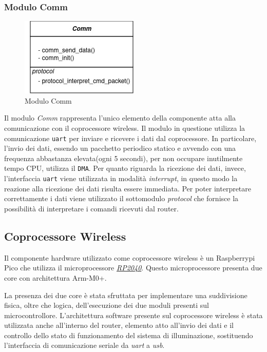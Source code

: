 \documentclass{article}
\begin{document}
	\subsubsection{Modulo Comm}
	\begin{figure}[ht]
		\centering
		\includegraphics[scale=0.5]{./images/Comm.jpg}
		\caption{Modulo Comm}
		\label{img:comm}
	\end{figure}
	\noindent Il modulo \textit{Comm} rappresenta l'unico elemento della componente atta alla comunicazione con il coprocessore wireless.
	Il modulo in questione utilizza la comunicazione \texttt{uart} per inviare e ricevere i dati dal coprocessore.
	In particolare, l'invio dei dati, essendo un pacchetto periodico statico e avvendo con una frequenza abbastanza elevata(ogni 5 secondi), per non occupare inutilmente tempo CPU, utilizza il \texttt{DMA}.
	Per quanto riguarda la ricezione dei dati, invece, l'interfaccia \texttt{uart} viene utilizzata in modalit\`a \textit{interrupt}, in questo modo la reazione alla ricezione dei dati risulta essere immediata.
	Per poter interpretare correttamente i dati viene utilizzato il sottomodulo \textit{protocol} che fornisce la possibilit\`a di interpretare i comandi ricevuti dal router.
	
	\subsection{Coprocessore Wireless}
	Il componente hardware utilizzato come coprocessore wireless \`e un Raspberrypi Pico che utilizza il microprocessore \href{https://www.raspberrypi.com/documentation/microcontrollers/silicon.html#rp2040}{\textit{RP2040}}. Questo microprocessore presenta due core con architettura Arm-M0+.
	
	\noindent La presenza dei due core \`e stata sfruttata per implementare una suddivisione fisica, oltre che logica, dell'esecuzione dei due moduli presenti sul microcontrollore.
	L'architettura software presente sul coprocessore wireless \`e stata utilizzata anche all'interno del router, elemento atto all'invio dei dati e il controllo dello stato di funzionamento del sistema di illuminazione, sostituendo l'interfaccia di comunicazione seriale da \textit{uart} a \textit{usb}.
	
\end{document}
